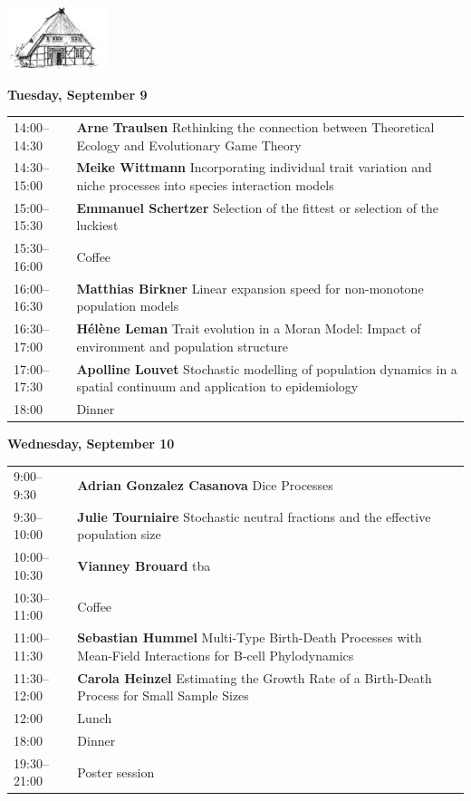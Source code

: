 \documentclass[12pt,a4paper]{article}
\newcommand{\Kopf}{%
\begin{center}%
\includegraphics[width=.2\textwidth]{logo-tsh}\\[2ex]
\end{center}
}
\begin{document}
\pagebreak 
\pagestyle{headings}
\renewcommand{\arraystretch}{1.85}

\Kopf
\vspace*{.75cm}

\textbf{\Large Tuesday, September 9}\medskip

\begin{tabular}{@{}l p{}@{}}
14:00--14:30 &\textbf{Arne Traulsen } Rethinking the connection between Theoretical Ecology and Evolutionary Game Theory \\
14:30--15:00 &\textbf{Meike Wittmann } Incorporating individual trait variation and niche processes into species interaction models \\
15:00--15:30 &\textbf{Emmanuel Schertzer } Selection of the fittest or selection of the luckiest \\
15:30--16:00 & Coffee \\
16:00--16:30 &\textbf{Matthias Birkner } Linear expansion speed for non-monotone population models \\
16:30--17:00 &\textbf{Hélène Leman } Trait evolution in a Moran Model: Impact of environment and population structure \\
17:00--17:30 &\textbf{Apolline Louvet } Stochastic modelling of population dynamics in a spatial continuum and application to epidemiology \\
18:00 & Dinner \\
\end{tabular}

\textbf{\Large Wednesday, September 10}\medskip

\begin{tabular}{@{}l p{}@{}}
9:00--9:30 &\textbf{Adrian Gonzalez Casanova } Dice Processes \\
9:30--10:00 &\textbf{Julie Tourniaire } Stochastic neutral fractions and the effective population size \\
10:00--10:30 &\textbf{Vianney Brouard } tba \\
10:30--11:00 & Coffee \\
11:00--11:30 &\textbf{Sebastian Hummel } Multi-Type Birth-Death Processes with Mean-Field Interactions for B-cell Phylodynamics \\
11:30--12:00 &\textbf{Carola Heinzel } Estimating the Growth Rate of a Birth-Death Process for Small Sample Sizes \\
12:00 & Lunch \\
18:00 & Dinner \\
19:30--21:00 & Poster session \\
\end{tabular}
\end{document}
